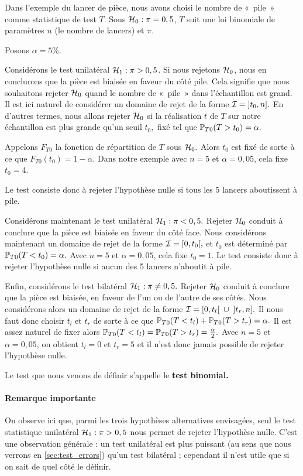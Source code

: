 \begin{exemple}
	Dans l'exemple du lancer de pièce, nous avons choisi le nombre de «~pile~» comme
	statistique de test $T$. Sous $\mathcal{H}_0 : \pi = 0,5$, $T$ suit une loi binomiale
	de paramètres $n$ (le nombre de lancers) et $\pi$.
	
	Posons $\alpha = 5\%.$
	
	Considérons le test unilatéral $\mathcal{H}_1 : \pi > 0,5$. Si nous rejetons $\mathcal{H}_0$,
	nous en conclurons que la pièce est biaisée en faveur du côté pile. Cela
	signifie que nous souhaitons rejeter $\mathcal{H}_0$ quand le nombre de «~pile~» dans
	l'échantillon est grand. Il est ici naturel de considérer un domaine de rejet
	de la forme $\mathcal{I} = \mathopen]t_0, n\mathclose].$ En d'autres termes, nous
	allons rejeter $\mathcal{H}_0$ si la réalisation $t$ de $T$ sur notre échantillon est
	plus grande qu'un seuil $t_0,$ fixé tel que $\mathbb{P}_{T0}(T > t_0) = \alpha.$
	
	Appelons $F_{T0}$ la fonction de répartition de $T$ sous $\mathcal{H}_0.$ Alors $t_0$
	est fixé de sorte à ce que $F_{T0}(t_0) = 1-\alpha$. Dans notre exemple avec
	$n=5$ et $\alpha=0,05$, cela fixe $t_0 = 4.$
	
	Le test consiste donc à rejeter l'hypothèse nulle si tous les 5 lancers
	aboutissent à pile.
	
	Considérons maintenant le test unilatéral $\mathcal{H}_1 : \pi < 0,5.$ Rejeter
	$\mathcal{H}_0$ conduit à conclure que la pièce est biaisée en faveur du côté
	face. Nous considérons maintenant un domaine de rejet de la forme
	$\mathcal{I} = \mathopen[0, t_0 \mathclose[,$ et $t_0$ est déterminé par
	$\mathbb{P}_{T0}(T < t_0) = \alpha.$ Avec $n=5$ et $\alpha=0,05$, cela fixe
	$t_0=1$. Le test consiste donc à rejeter l'hypothèse nulle si aucun des 5
	lancers n'aboutit à pile.
	
	Enfin, considérons le test bilatéral $\mathcal{H}_1 : \pi \neq 0,5.$ Rejeter $\mathcal{H}_0$
	conduit à conclure que la pièce est biaisée, en faveur de l'un ou de l'autre
	de ses côtés. Nous considérons alors un domaine de rejet de la forme
	$\mathcal{I} = \mathopen[0, t_l \mathclose[ \; \cup \; \mathopen]t_r, n
	\mathclose].$
	Il nous faut donc choisir $t_l$ et $t_r$ de sorte à ce que
	$\mathbb{P}_{T0}(T < t_l) + \mathbb{P}_{T0}(T > t_r) = \alpha.$ Il est assez naturel de
	fixer alors $\mathbb{P}_{T0}(T < t_l) = \mathbb{P}_{T0}(T > t_r) = \frac{\alpha}{2}.$ Avec
	$n=5$ et $\alpha=0,05$, on obtient $t_l = 0$ et $t_r = 5$ et il n'est donc
	jamais possible de rejeter l'hypothèse nulle.
	
	Le test que nous venons de définir s'appelle le \textbf{test binomial.}
	
	\paragraph{Remarque importante} On observe ici que, parmi les trois
	hypothèses alternatives envisagées, seul le test statistique unilatéral
	$\mathcal{H}_1: \pi > 0,5$ nous permet de rejeter l'hypothèse nulle. C'est une
	observation générale : un test unilatéral est plus puissant (au sens que nous verrons en \ref{sec:test_errors}) qu'un test
	bilatéral ; cependant il n'est utile que si on sait de quel côté le définir.
\end{exemple}


